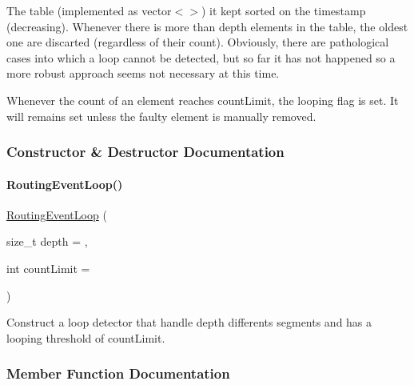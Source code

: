 The table (implemented as {\ttfamily vector$<$$>$}) it kept sorted on the timestamp (decreasing). Whenever there is more than {\ttfamily depth} elements in the table, the oldest one are discarted (regardless of their count). Obviously, there are pathological cases into which a loop cannot be detected, but so far it has not happened so a more robust approach seems not necessary at this time.

Whenever the count of an element reaches {\ttfamily count\+Limit}, the looping flag is set. It will remains set unless the faulty element is manually removed. 

\subsubsection{Constructor \& Destructor Documentation}
\mbox{\label{classKite_1_1RoutingEventLoop_aa33efa06ccc2175e35eff7ac6dadffb6}} 
\paragraph{\texorpdfstring{Routing\+Event\+Loop()}{RoutingEventLoop()}}
{\footnotesize\ttfamily \hyperlink{classKite_1_1RoutingEventLoop}{Routing\+Event\+Loop} (\begin{DoxyParamCaption}\item[{size\+\_\+t}]{depth = {},  }\item[{int}]{count\+Limit = {} }\end{DoxyParamCaption})}

Construct a loop detector that handle {\ttfamily depth} differents segments and has a looping threshold of {\ttfamily count\+Limit}. 

\subsubsection{Member Function Documentation}
\mbox{\label{classKite_1_1RoutingEventLoop_a78155a2b0119ac92d377fa404e348a98}} 
